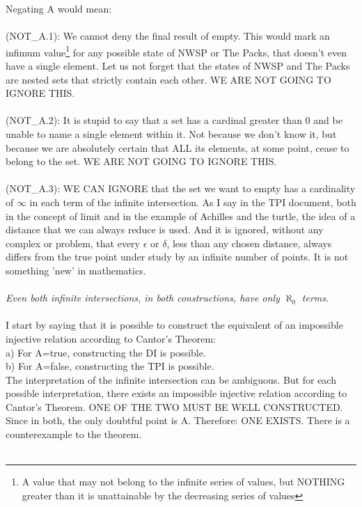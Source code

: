 	\noindent
	Negating A would mean:\\\\
	(NOT\_A.1): We cannot deny the final result of empty. This would mark an infimum value\footnote{A value that may not belong to the infinite series of values, but NOTHING greater than it is unattainable by the decreasing series of values} for any possible state of NWSP or The Packs, that doesn't even have a single element. Let us not forget that the states of NWSP and The Packs are nested sets that strictly contain each other. WE ARE NOT GOING TO IGNORE THIS.\\\\
	(NOT\_A.2): It is stupid to say that a set has a cardinal greater than 0 and be unable to name a single element within it. Not because we don't know it, but because we are absolutely certain that ALL its elements, at some point, cease to belong to the set. WE ARE NOT GOING TO IGNORE THIS.\\\\
	(NOT\_A.3): WE CAN IGNORE that the set we want to empty has a cardinality of $\infty$ in each term of the infinite intersection. As I say in the TPI document, both in the concept of limit and in the example of Achilles and the turtle, the idea of a distance that we can always reduce is used. And it is ignored, without any complex or problem, that every $\epsilon$ or $\delta$, less than any chosen distance, always differs from the true point under study by an infinite number of points. It is not something 'new' in mathematics.\\\\
	
	\noindent
	\textit{Even both infinite intersections, in both constructions, have only $\aleph_{0}$ terms.}\\\\

	\noindent
	I start by saying that it is possible to construct the equivalent of an impossible injective relation according to Cantor's Theorem:\\
	a) For A=true, constructing the DI is possible.\\
	b) For A=false, constructing the TPI is possible.\\
	
	\noindent
	The interpretation of the infinite intersection can be ambiguous. But for each possible interpretation, there exists an impossible injective relation according to Cantor's Theorem. ONE OF THE TWO MUST BE WELL CONSTRUCTED. Since in both, the only doubtful point is A. Therefore: ONE EXISTS. There is a counterexample to the theorem.\\\\
	
